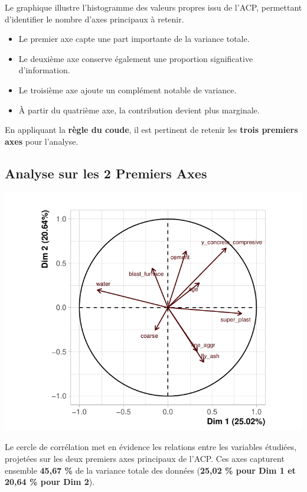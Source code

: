 \documentclass[
  12pt,
]{article}
\providecommand{\tightlist}{%
  \setlength{\itemsep}{0pt}\setlength{\parskip}{0pt}}
\begin{document}
Le graphique illustre l'histogramme des valeurs propres issu de l'ACP,
permettant d'identifier le nombre d'axes principaux à retenir.

\begin{itemize}
\tightlist
\item
  Le premier axe capte une part importante de la variance totale.
\item
  Le deuxième axe conserve également une proportion significative
  d'information.
\item
  Le troisième axe ajoute un complément notable de variance.
\item
  À partir du quatrième axe, la contribution devient plus marginale.
\end{itemize}

En appliquant la \textbf{règle du coude}, il est pertinent de retenir
les \textbf{trois premiers axes} pour l'analyse.

\subsection{Analyse sur les 2 Premiers
Axes}\label{analyse-sur-les-2-premiers-axes}

\begin{center}\includegraphics{rmd_final_files/figure-latex/unnamed-chunk-31-1} \end{center}

Le cercle de corrélation met en évidence les relations entre les
variables étudiées, projetées sur les deux premiers axes principaux de
l'ACP. Ces axes capturent ensemble \textbf{45,67 \%} de la variance
totale des données (\textbf{25,02 \% pour Dim 1 et 20,64 \% pour Dim
2}).
\end{document}
